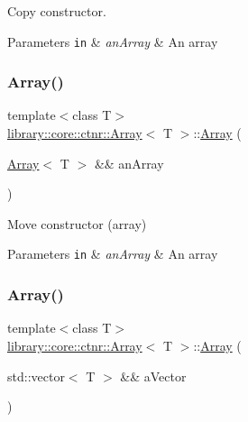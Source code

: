 Copy constructor. 


\begin{DoxyParams}[1]{Parameters}
\mbox{\tt in}  & {\em an\+Array} & An array \\
\hline
\end{DoxyParams}
\mbox{\label{classlibrary_1_1core_1_1ctnr_1_1_array_ac8f7c5d2c05b3acb427fdeb15656f110}} 
\subsubsection{\texorpdfstring{Array()}{Array()}\hspace{0.1cm}{\footnotesize\ttfamily [7/8]}}
{\footnotesize\ttfamily template$<$class T$>$ \\
\hyperlink{classlibrary_1_1core_1_1ctnr_1_1_array}{library\+::core\+::ctnr\+::\+Array}$<$ T $>$\+::\hyperlink{classlibrary_1_1core_1_1ctnr_1_1_array}{Array} (\begin{DoxyParamCaption}\item[{\hyperlink{classlibrary_1_1core_1_1ctnr_1_1_array}{Array}$<$ T $>$ \&\&}]{an\+Array }\end{DoxyParamCaption})\hspace{0.3cm}{\ttfamily [default]}}



Move constructor (array) 


\begin{DoxyParams}[1]{Parameters}
\mbox{\tt in}  & {\em an\+Array} & An array \\
\hline
\end{DoxyParams}
\mbox{\label{classlibrary_1_1core_1_1ctnr_1_1_array_a8a0e7141a92b203ca411778799db9696}} 
\subsubsection{\texorpdfstring{Array()}{Array()}\hspace{0.1cm}{\footnotesize\ttfamily [8/8]}}
{\footnotesize\ttfamily template$<$class T$>$ \\
\hyperlink{classlibrary_1_1core_1_1ctnr_1_1_array}{library\+::core\+::ctnr\+::\+Array}$<$ T $>$\+::\hyperlink{classlibrary_1_1core_1_1ctnr_1_1_array}{Array} (\begin{DoxyParamCaption}\item[{std\+::vector$<$ T $>$ \&\&}]{a\+Vector }\end{DoxyParamCaption})}



